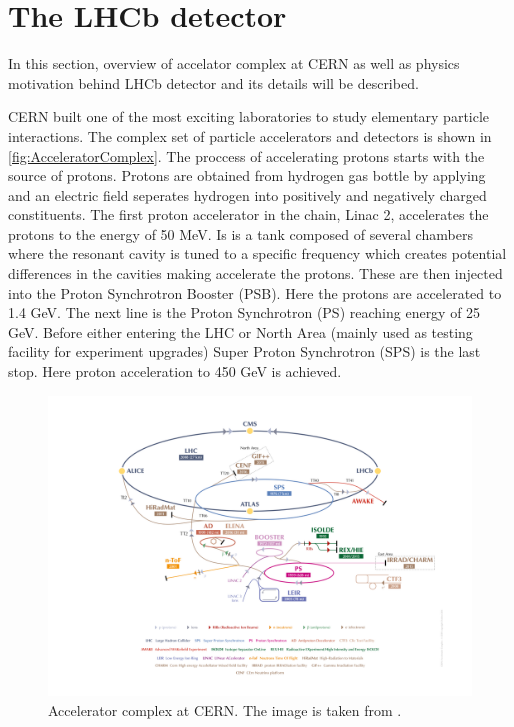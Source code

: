 \chapter{The LHCb detector}
\label{chap:dec}
In this section, overview of accelator complex at CERN as well as physics motivation behind \Gls{LHCb} detector and its details will be described.

CERN built one of the most exciting laboratories to study elementary particle interactions. The complex set of particle accelerators and detectors is shown in \autoref{fig:AcceleratorComplex}. The proccess of accelerating protons starts with the source of protons. Protons are obtained from hydrogen gas bottle by applying and an electric field seperates hydrogen into positively and negatively charged constituents. The first proton accelerator in the chain, Linac 2, accelerates the protons to the energy of 50 MeV. Is is a tank composed of several chambers where the resonant cavity is tuned to a specific frequency which creates potential differences in the cavities making accelerate the protons. These are then injected into the Proton Synchrotron Booster (PSB). Here the protons are accelerated to 1.4 GeV. The next line is the Proton Synchrotron (PS) reaching energy of 25 GeV. Before either entering the LHC or North Area (mainly used as testing facility for experiment upgrades) Super Proton Synchrotron (SPS) is the last stop. Here proton acceleration to 450 GeV is achieved.

\begin{figure}
  \centering
  \includegraphics[scale = 1.0]{figs/detector/AccComplex.png}
	\caption{Accelerator complex at CERN. The image is taken from \cite{complex}.}
  \label{fig:AcceleratorComplex}
\end{figure}

